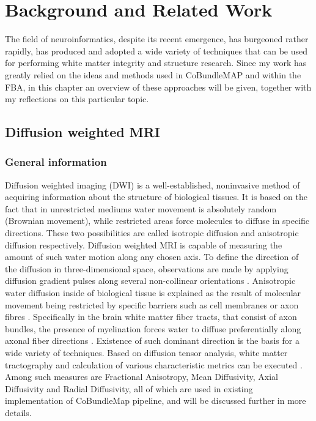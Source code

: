 \documentclass[thesis.tex]{subfiles}
\begin{document}
\chapter{Background and Related Work}
The field of neuroinformatics, despite its recent emergence, has burgeoned rather rapidly, has produced and adopted a wide variety of techniques that can be used for performing white matter integrity and structure research. Since my work has greatly relied on the ideas and methods used in CoBundleMAP and within the FBA, in this chapter an overview of these approaches will be given, together with my reflections on this particular topic.

\section{Diffusion weighted MRI}
\subsection{General information}
Diffusion weighted imaging (DWI) is a well-established, noninvasive method of acquiring information about the structure of biological tissues. It is based on the fact that in unrestricted mediums water movement is absolutely random (Brownian movement), while restricted areas force molecules to diffuse in specific directions. These two possibilities are called isotropic diffusion and anisotropic diffusion respectively. Diffusion weighted MRI is capable of measuring the amount of such water motion along any chosen axis. To define the direction of the diffusion in three-dimensional space, observations are made by applying diffusion gradient pulses along several non-collinear orientations \cite{ChanraudDTI}.
Anisotropic water diffusion inside of biological tissue is explained as the result of molecular movement being restricted by specific barriers such as cell membranes or axon fibres \cite{diffusion1990Moseley}. Specifically in the brain white matter fiber tracts, that consist of axon bundles, the presence of myelination forces water to diffuse preferentially along axonal fiber directions \cite{WMdiffusion} \cite{Mori1999DiffusionMR}. Existence of such dominant direction is the basis for a wide variety of techniques. Based on diffusion tensor analysis, white matter tractography and calculation of various characteristic metrics can be executed \cite{Basser1995InferringMF}. Among such measures are Fractional Anisotropy, Mean Diffusivity, Axial Diffusivity and Radial Diffusivity, all of which are used in existing implementation of CoBundleMap pipeline, and will be discussed further in more details.
\end{document}
